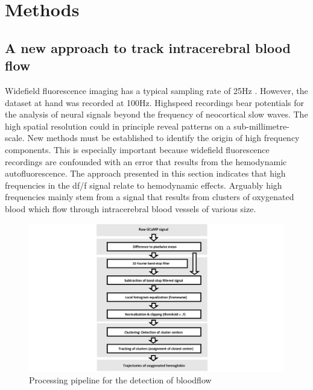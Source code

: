 
\chapter{Methods} %
\label{ChapterX} %
\section{A new approach to track intracerebral blood flow}
Widefield fluorescence imaging has a typical sampling rate of 25Hz \parencite{celotto2020analysis}. However, the dataset at hand was recorded at 100Hz. Highspeed recordings bear potentials for the analysis of neural signals beyond the frequency of neocortical slow waves. The high spatial resolution could in principle reveal patterns on a sub-millimetre-scale. New methods must be established to identify the origin of high frequency components. This is especially important because widefield fluorescence recordings are confounded with an error that results from the hemodynamic autofluorescence. The approach presented in this section indicates that high frequencies in the df/f signal relate to hemodynamic effects. Arguably high frequencies mainly stem from a signal that results from clusters of oxygenated blood which flow through intracerebral blood vessels of various size.\\
\begin{figure}[!htb]
\centering
\includegraphics[width=\textwidth,height=\textheight,keepaspectratio]{Figures/tracking_bloodflow_pipeline}
\decoRule
\caption[Processing pipeline for the detection of bloodflow]{Processing pipeline for the detection of bloodflow}
\label{fig:clustering_approach_pipeline}
\end{figure}
